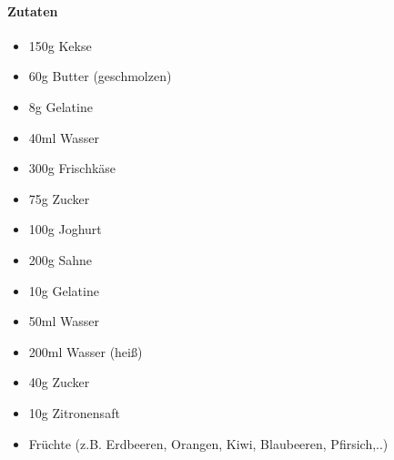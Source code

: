 \newpage
{}

\paragraph{Zutaten}
\begin{itemize}[noitemsep]
	\item 150g Kekse
	\item 60g Butter (geschmolzen)
	\item 8g Gelatine
	\item 40ml Wasser
	\item 300g Frischkäse
	\item 75g Zucker
	\item 100g Joghurt
	\item 200g Sahne
	\item 10g Gelatine
	\item 50ml Wasser
	\item 200ml Wasser (heiß)
	\item 40g Zucker
	\item 10g Zitronensaft
	\item Früchte (z.B. Erdbeeren, Orangen, Kiwi, Blaubeeren, Pfirsich,..)
\end{itemize}


